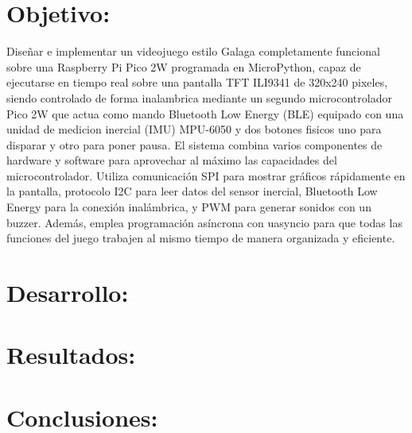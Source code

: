 \documentclass[letterpaper,12pt]{article}
\begin{document}
    

    \newpage
    \setcounter{page}{1}

    \section{Objetivo:}

    Diseñar e implementar un videojuego estilo Galaga completamente funcional sobre una Raspberry Pi Pico 2W programada en MicroPython, capaz de ejecutarse en tiempo real sobre una pantalla 
    TFT ILI9341 de 320x240 pixeles, siendo controlado de forma inalambrica mediante un segundo microcontrolador Pico 2W que actua como mando Bluetooth Low Energy (BLE) equipado con una unidad de medicion inercial (IMU) MPU-6050 
    y dos botones fisicos uno para disparar y otro para poner pausa. El sistema combina varios componentes de hardware y software para 
    aprovechar al máximo las capacidades del microcontrolador. 
    Utiliza comunicación SPI para mostrar gráficos rápidamente en la pantalla, 
    protocolo I2C para leer datos del sensor inercial, 
    Bluetooth Low Energy para la conexión inalámbrica, y 
    PWM para generar sonidos con un buzzer. 
    Además, emplea programación asíncrona con uasyncio para que 
    todas las funciones del juego trabajen al mismo tiempo de manera 
    organizada y eficiente.

    \section{Desarrollo:}
    

    \newpage
    \section{Resultados:}
    

    \newpage
    \section{Conclusiones:}
\end{document}
